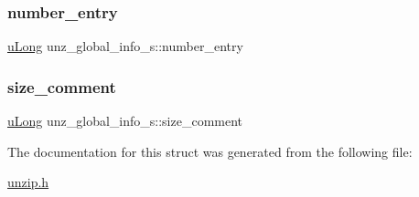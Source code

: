 \subsubsection{\texorpdfstring{number\+\_\+entry}{number\_entry}}
{\footnotesize\ttfamily \hyperlink{ioapi_8h_a50e9e9d5c30e481de822ad68fe537986}{u\+Long} unz\+\_\+global\+\_\+info\+\_\+s\+::number\+\_\+entry}

\mbox{\label{structunz__global__info__s_a10b58ab57b62301de813ecac0e974363}} 
\subsubsection{\texorpdfstring{size\+\_\+comment}{size\_comment}}
{\footnotesize\ttfamily \hyperlink{ioapi_8h_a50e9e9d5c30e481de822ad68fe537986}{u\+Long} unz\+\_\+global\+\_\+info\+\_\+s\+::size\+\_\+comment}



The documentation for this struct was generated from the following file\+:\begin{DoxyCompactItemize}
\item 
\hyperlink{unzip_8h}{unzip.\+h}\end{DoxyCompactItemize}
